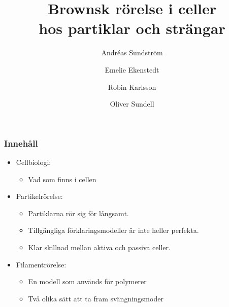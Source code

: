 \documentclass[swedish]{beamer}
\title[Brownsk rörelse i celler]{Brownsk rörelse i celler\\ hos partiklar och strängar} %
\subtitle{} %
\author{Andréas Sundström \and Emelie Ekenstedt \and Robin Karlsson \and Oliver Sundell} %
\institute[Chalmers]{Chalmers tekniska högskola, \\Institutionen för fysik, \\Avdelningen för biofysik}
\date{\vspace{-0.25cm}}
\begin{document}
\begin{frame}[plain]

\linethickness{0.075mm}

  \titlepage
\end{frame}









\begin{frame}
\frametitle{Innehåll}

\begin{itemize}[label={$\bullet$}]
    \item Cellbiologi:
    \begin{itemize}[label={--}]
        \item Vad som finns i cellen
    \end{itemize}
    \item Partikelrörelse:
    \begin{itemize}[label={--}]
        \item Partiklarna rör sig för långsamt. 
        \item Tillgängliga förklaringsmodeller är inte heller perfekta. 
        \item Klar skillnad mellan aktiva och passiva celler.
    \end{itemize}
    \item Filamentrörelse:
    \begin{itemize}[label={--}]
        \item En modell som används för polymerer
        \item Två olika sätt att ta fram svängningsmoder
    \end{itemize}
\end{itemize}


\end{frame}
\end{document}
